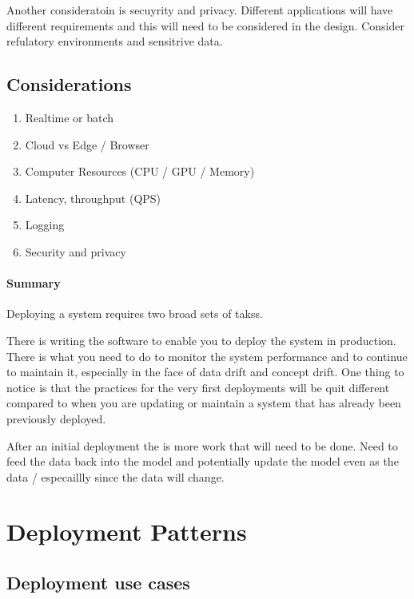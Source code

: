 Another consideratoin is secuyrity and privacy. Different applications will have different requirements and this will need to be considered in the design. Consider refulatory environments and sensitrive data.

\subsection{Considerations}

\begin{enumerate}
    \item Realtime or batch
    \item Cloud vs Edge / Browser
    \item Computer Resources (CPU / GPU / Memory)
    \item Latency, throughput (QPS)
    \item Logging
    \item Security and privacy
\end{enumerate}

\paragraph{Summary}

Deploying a system requires two broad sets of takss.

There is writing the software to enable you to deploy the system in production.
There is what you need to do to monitor the system performance and to continue to maintain it, especially in the face of data drift and concept drift.
One thing to notice is that the practices for the very first deployments will be quit different compared to when you are updating or maintain a system that has already been previously deployed.


After an initial deployment the is more work that will need to be done.
Need to feed the data back into the model and potentially update the model even as the data / especaillly since the data will change.



\section{Deployment Patterns}



\subsection{Deployment use cases}


